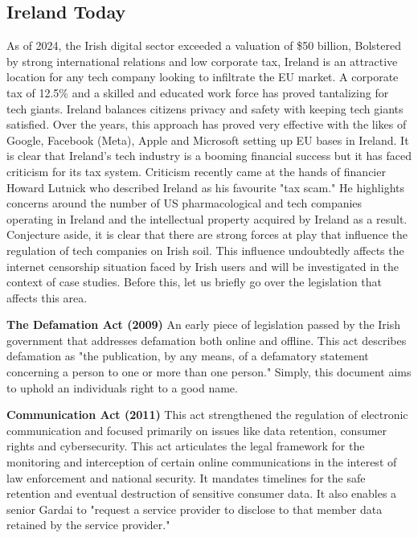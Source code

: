 \subsection{Ireland Today}
As of 2024, the Irish digital sector exceeded a valuation of \$50 billion, \cite{tradegov2025} Bolstered by strong international relations and low corporate tax, Ireland is an attractive location for any tech company looking to infiltrate the EU market. A corporate tax of 12.5\% \cite{revenueie2025} and a skilled and educated work force has proved tantalizing for tech giants. Ireland balances citizens privacy and safety with keeping tech giants satisfied. Over the years, this approach has proved very effective with the likes of Google, Facebook (Meta), Apple and Microsoft setting up EU bases in Ireland. It is clear that Ireland's tech industry is a booming financial success but it has faced criticism for its tax system. Criticism recently came at the hands of financier Howard Lutnick who described Ireland as his favourite "tax scam." \cite{archyde2025} He highlights concerns around the number of US pharmacological and tech companies operating in Ireland and the intellectual property acquired by Ireland as a result. Conjecture aside, it is clear that there are strong forces at play that influence the regulation of tech companies on Irish soil. This influence undoubtedly affects the internet censorship situation faced by Irish users and will be investigated in the context of case studies. Before this, let us briefly go over the legislation that affects this area. 

\textbf{The Defamation Act (2009)}
An early piece of legislation passed by the Irish government that addresses defamation both online and offline. This act describes defamation as "the publication, by any means, of a defamatory statement concerning a person to one or more than one person." \cite{defamation2009} Simply, this document aims to uphold an individuals right to a good name.

\textbf{Communication Act (2011)}
This act strengthened the regulation of electronic communication and focused primarily on issues like data retention, consumer rights and cybersecurity. This act articulates the legal framework for the monitoring and interception of certain online communications in the interest of law enforcement and national security. It mandates timelines for the safe retention and eventual destruction of sensitive consumer data. It also enables a senior Gardai to "request a service provider to disclose to that member data retained by the service provider." \cite{communications2011}

